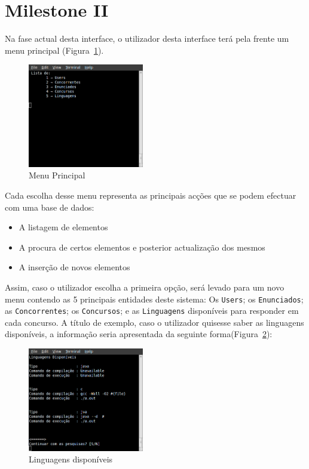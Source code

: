 \section{Milestone II}

Na fase actual desta interface, o utilizador desta interface terá pela frente um menu principal (Figura~\ref{img:menuprinc}). \\

\begin{figure}[H]
\begin{center}
\includegraphics[width=0.45\textwidth]{Images/menuPrinc}
\caption{Menu Principal}\label{img:menuprinc}
\end{center}
\end{figure} 

Cada escolha desse menu representa as principais acções que se podem efectuar com uma base de dados: 

\begin{itemize}
 \item A listagem de elementos
 \item A procura de certos elementos e posterior actualização dos mesmos
 \item A inserção de novos elementos
\end{itemize}

Assim, caso o utilizador escolha a primeira opção, será levado para um novo menu contendo as 5 principais entidades deste sistema: Os \texttt{Users}; os \texttt{Enunciados}; as \texttt{Concorrentes}; os \texttt{Concursos}; e as \texttt{Linguagens} disponíveis para responder em cada concurso. A título de exemplo, caso o utilizador quisesse saber 
as linguagens disponíveis, a informação seria apresentada da seguinte forma(Figura~\ref{img:linguagens}):\\

\begin{figure}[H]
\begin{center}
\includegraphics[width=0.45\textwidth]{Images/linguagens}
\caption{Linguagens disponíveis}\label{img:linguagens}
\end{center}
\end{figure} 

